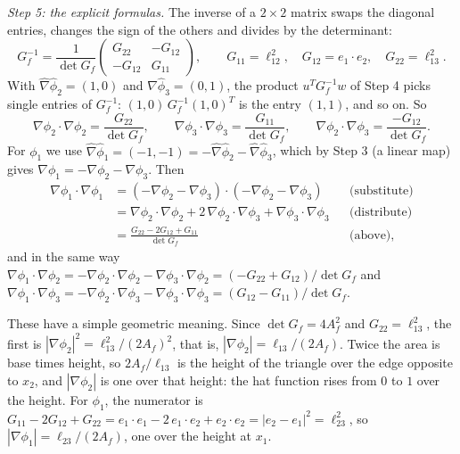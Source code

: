 \emph{Step 5: the explicit formulas.} The inverse of a $2 \times 2$ matrix swaps the diagonal entries, changes the sign of the others and divides by the determinant:
\begin{equation*}
G_f^{-1} = \frac{1}{\det G_f} \begin{pmatrix} G_{22} & -G_{12} \\ -G_{12} & G_{11} \end{pmatrix}, \qquad G_{11} = \ell_{12}^2,\quad G_{12} = e_1 \cdot e_2,\quad G_{22} = \ell_{13}^2 .
\end{equation*}
With $\hat\nabla\hat\phi_2 = (1, 0)$ and $\hat\nabla\hat\phi_3 = (0, 1)$, the product $u^T G_f^{-1} w$ of Step 4 picks single entries of $G_f^{-1}$: $(1,0)\,G_f^{-1}(1,0)^T$ is the entry $(1,1)$, and so on. So
\begin{equation*}
\nabla\phi_2 \cdot \nabla\phi_2 = \frac{G_{22}}{\det G_f}, \qquad \nabla\phi_3 \cdot \nabla\phi_3 = \frac{G_{11}}{\det G_f}, \qquad \nabla\phi_2 \cdot \nabla\phi_3 = \frac{-G_{12}}{\det G_f} .
\end{equation*}
For $\phi_1$ we use $\hat\nabla\hat\phi_1 = (-1,-1) = -\hat\nabla\hat\phi_2 - \hat\nabla\hat\phi_3$, which by Step 3 (a linear map) gives $\nabla\phi_1 = -\nabla\phi_2 - \nabla\phi_3$. Then
\begin{align*}
\nabla\phi_1\cdot\nabla\phi_1 &= (-\nabla\phi_2 - \nabla\phi_3)\cdot(-\nabla\phi_2 - \nabla\phi_3) && \text{(substitute)} \\
&= \nabla\phi_2\cdot\nabla\phi_2 + 2\,\nabla\phi_2\cdot\nabla\phi_3 + \nabla\phi_3\cdot\nabla\phi_3 && \text{(distribute)} \\
&= \frac{G_{22} - 2G_{12} + G_{11}}{\det G_f} && \text{(above),}
\end{align*}
and in the same way $\nabla\phi_1\cdot\nabla\phi_2 = -\nabla\phi_2\cdot\nabla\phi_2 - \nabla\phi_3\cdot\nabla\phi_2 = (-G_{22} + G_{12})/\det G_f$ and $\nabla\phi_1\cdot\nabla\phi_3 = -\nabla\phi_2\cdot\nabla\phi_3 - \nabla\phi_3\cdot\nabla\phi_3 = (G_{12} - G_{11})/\det G_f$.

These have a simple geometric meaning. Since $\det G_f = 4A_f^2$ and $G_{22} = \ell_{13}^2$, the first is $|\nabla\phi_2|^2 = \ell_{13}^2 / (2A_f)^2$, that is, $|\nabla\phi_2| = \ell_{13}/(2A_f)$. Twice the area is base times height, so $2A_f/\ell_{13}$ is the height of the triangle over the edge opposite to $x_2$, and $|\nabla\phi_2|$ is one over that height: the hat function rises from $0$ to $1$ over the height. For $\phi_1$, the numerator is $G_{11} - 2G_{12} + G_{22} = e_1\cdot e_1 - 2\,e_1\cdot e_2 + e_2\cdot e_2 = |e_2 - e_1|^2 = \ell_{23}^2$, so $|\nabla\phi_1| = \ell_{23}/(2A_f)$, one over the height at $x_1$.

